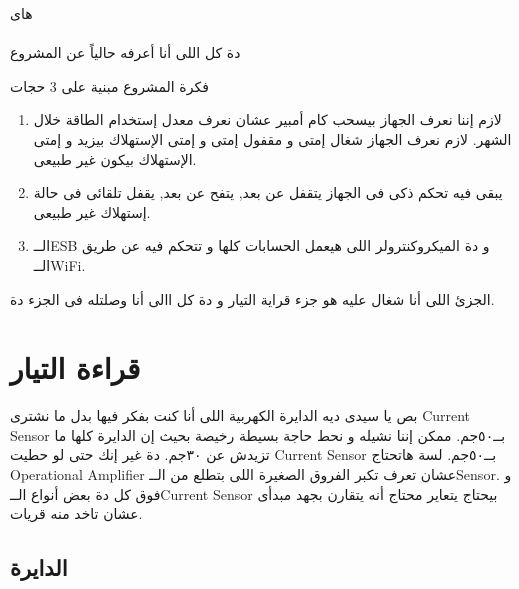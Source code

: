 \documentclass{article}
\begin{document}
\renewcommand{\figurename}{}
\renewcommand{\tablename}{}
\pagestyle{empty}
\begin{center}\huge

    \vspace*{100pt}
    هاى \\
    \vspace{36pt}
    {\aracricfont }
    \vspace{36pt}\\
    دة كل اللى أنا أعرفه حالياً عن المشروع
\end{center}

فكرة المشروع مبنية على 3 حجات 
\begin{enumerate}
    \item لازم إننا نعرف الجهاز بيسحب كام أمبير عشان نعرف معدل إستخدام الطاقة خلال الشهر. لازم نعرف الجهاز شغال إمتى و مقفول إمتى و إمتى الإستهلاك بيزيد و إمتى الإستهلاك بيكون غير طبيعى.
    \item يبقى فيه تحكم ذكى فى الجهاز يتقفل عن بعد, يتفح عن بعد, يقفل تلقائى فى حالة إستهلاك غير طبيعى.
    \item الــ\textenglish{ESB} و دة الميكروكنترولر اللى هيعمل الحسابات كلها و تتحكم فيه عن طريق الــ\textenglish{WiFi}.
\end{enumerate}\vspace{12pt}

الجزئ اللى أنا شغال عليه هو جزء قراية التيار و  دة كل االى أنا وصلتله فى الجزء دة.

\newpage

\pagestyle{plain}

\section{قراءة التيار}

بص يا سيدى ديه الدايرة الكهربية اللى أنا كنت بفكر فيها بدل ما نشترى
\textenglish{Current Sensor} بــ٥٠جم.
ممكن إننا نشيله و نحط حاجة بسيطة رخيصة بحيث إن الدايرة كلها ما تزيدش عن ٣٠جم. دة غير إنك حتى لو حطيت 
\textenglish{Current Sensor} بــ٥٠جم. 
لسة هاتحتاج \textenglish{Operational Amplifier} عشان تعرف تكبر الفروق الصغيرة اللى بتطلع من الــ\textenglish{Sensor}.
و فوق كل دة بعض أنواع الــ\textenglish{Current Sensor} بيحتاج يتعاير محتاج أنه يتقارن بجهد مبدأى عشان تاخد منه قريات.

\subsection{الدايرة}
 
\end{document}
